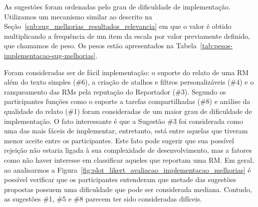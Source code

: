 As sugestões foram ordenadas pelo grau de dificuldade de implementação.
Utilizamos um mecanismo similar ao descrito na
Seção~\ref{sub:sug_melhorias_resultados_relevancia} em que o valor é obtido
multiplicando a frequência de um item da escala por valor previamente definido,
que chamamos de peso. Os pesos estão apresentados na
Tabela~\ref{tab:pesos-implementacao-sug-melhorias}.

\begin{table}[htpb]
\centering
{}
\caption{Pesos utilizados no ranqueamento das sugestões de melhorias}
\label{tab:pesos-implementacao-sug-melhorias}
\end{table}

Foram consideradas ser de fácil implementação: o suporte do relato de uma RM
além do texto simples (\#6), a criação de atalhos e filtros personalizáveis
(\#4) e o ranqueamento das RMs pela reputação do Reportador (\#3). Segundo os
participantes funções como o suporte a tarefas compartilhadas (\#8) e análise
da qualidade do relato (\#1) foram consideradas de um maior grau de dificuldade
de implementação. O fato interessante é que a Sugestão \#3 foi considerada como
uma das mais fáceis de implementar, entretanto, está entre aquelas que tiveram
menor aceite entre os participantes. Este fato pode sugerir que sua possível
rejeição não estaria ligada à sua complexidade de desenvolvimento, mas a
fatores como não haver interesse em classificar aqueles que reportam uma RM\@.
Em geral, ao analisarmos a
Figura~\ref{fig:plot_likert_avaliacao_implementacao_melhorias} é possível
verificar que os participantes entenderam que metade das sugestões propostas
possuem uma dificuldade que pode ser considerada mediana. Contudo, as sugestões
\#1, \#5 e \#8 parecem ter sido consideradas difíceis.

